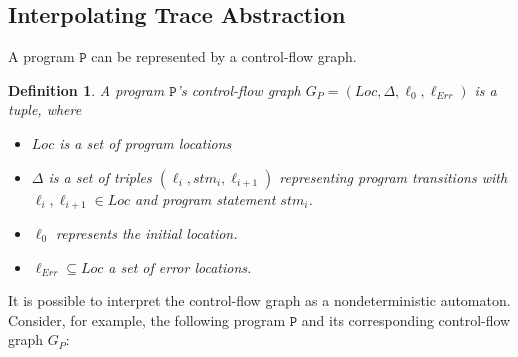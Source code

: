 \documentclass{article}
\newtheorem{mydef}{Definition}
\begin{document}
\subsection{Interpolating Trace Abstraction}
A program $\texttt{P}$ can be represented by a control-flow graph.
\begin{mydef}
	A program $\texttt{P}$'s control-flow graph $G_P = (Loc, \Delta, \ell_{0}, \ell_{Err})$ is a tuple, where
	 \begin{itemize}
		\item $Loc$ is a set of program locations
		\item $\Delta$ is a set of triples $(\ell_i, stm_i, \ell_{i + 1})$ representing program transitions with $\ell_i, \ell_{i + 1} \in Loc$ and program statement $stm_i$.
		\item $\ell_{0}$ represents the initial location.
		\item $\ell_{Err} \subseteq Loc$ a set of error locations.
	\end{itemize}
\end{mydef}
It is possible to interpret the control-flow graph as a nondeterministic automaton. \\ 

Consider, for example, the following program $\texttt{P}$ and its corresponding control-flow graph $G_P$:
\end{document}
